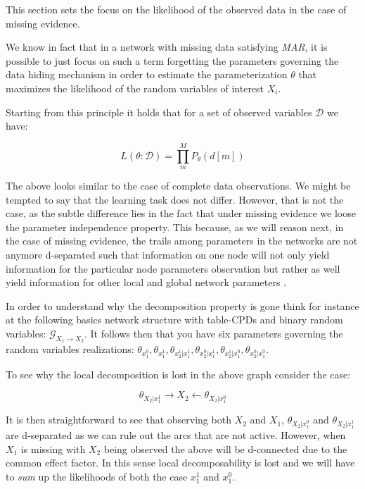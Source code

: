 \documentclass[11pt]{article}
\begin{document}
\begin{article}
This section sets the focus on the likelihood of the observed data
in the case of missing evidence.

We know in fact that in a network with missing data satisfying
\emph{MAR}, it is possible to just focus on such a term forgetting the
parameters governing the data hiding mechanism in order to estimate
the parameterization \(\theta\) that maximizes the likelihood of the
random variables of interest \(X_i\).

Starting from this principle it holds that for a set of observed
variables \(\mathcal{D}\) we have:

$$ L(\theta: \mathcal{D}) = \prod_m^M P_\theta(d[m]) $$

The above looks similar to the case of complete data
observations. We might be tempted to say that the learning task
does not differ. However, that is not the case, as the subtle
difference lies in the fact that under missing evidence we loose
the parameter independence property. This because, as we will
reason next, in the case of missing evidence, the trails among
parameters in the networks are not anymore d-separated such that
information on one node will not only yield information for the
particular node parameters observation but rather as well yield
information for other local and global network parameters .

In order to understand why the decomposition property is gone think
for instance at the following basics network structure with
table-CPDs and binary random variables: \(\mathscr{G}_{X_1
   \rightarrow X_2}\). It follows then that you have six parameters
governing the random variables realizations: \(\theta_{x_1^0},
   \theta_{x_1^1}, \theta_{x_2^1| x_1^1}, \theta_{x_2^0 | x_1^1},
   \theta_{x_2^1 | x_1^0}, \theta_{x_2^0 | x_1^0}\).

To see why the local decomposition is lost in the above graph
consider the case:

$$\theta_{X_2 | x_1^1} \rightarrow X_2 \leftarrow \theta_{X_2 |
   x_1^0}$$

It is then straightforward to see that observing both \(X_2\) and
\(X_1\), \(\theta_{X_2 | x_1^0}\) and \(\theta_{X_2 | x_1^1}\) are
d-separated as we can rule out the arcs that are not
active. However, when \(X_1\) is missing with \(X_2\) being observed
the above will be d-connected due to the common effect factor. In
this sense local decomposability is lost and we will have to \emph{sum}
up the likelihoods of both the case \(x_1^1\) and \(x_1^0\).


\end{article}
\end{document}

